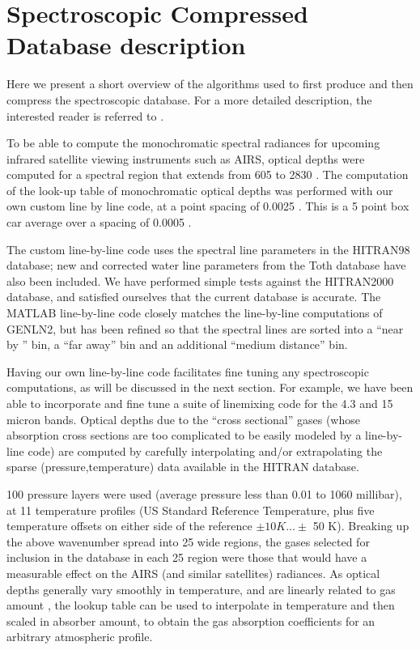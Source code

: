 \documentclass[11pt]{article}
\begin{document}
\section{Spectroscopic Compressed Database description}

Here we present a short overview of the algorithms used to first produce and 
then compress the spectroscopic database. For a more detailed description,
the interested reader is referred to \cite{str:97}.

To be able to compute the monochromatic spectral radiances for upcoming 
infrared satellite viewing instruments such as AIRS, optical depths were 
computed for a spectral region that extends from 605 \wn to 2830 \wn. The 
computation of the look-up table of monochromatic optical depths was 
performed with our own custom line by line code, at a point spacing of 
0.0025 \wn. This is a 5 point box car average over a spacing of 0.0005 \wn.

The custom line-by-line code uses the spectral line parameters in the 
\textsf{HITRAN98} database; new and corrected water line parameters from 
the \textsf{Toth} database have also been included. We have performed simple
tests against the \textsf{HITRAN2000} database, and satisfied ourselves that 
the current database is accurate. The \textsf{MATLAB} 
line-by-line code closely matches the line-by-line computations of 
\textsf{GENLN2}\cite{edw:92}, but has been refined so that the spectral lines
are sorted into a ``near by '' bin, a ``far away'' bin and an additional 
``medium distance'' bin. 

Having our own line-by-line code facilitates fine 
tuning any spectroscopic computations, as will be discussed in the next 
section. For example, we have been able to incorporate and fine tune a suite 
of linemixing code for the 4.3 and 15 micron \cd bands.
Optical depths due to the ``cross sectional'' gases (whose absorption cross 
sections are too complicated to be easily modeled by a line-by-line code) are 
computed by carefully interpolating and/or extrapolating the sparse 
(pressure,temperature) data available in the \textsf{HITRAN} database.

100 pressure layers were used (average pressure less than 0.01 
to 1060 millibar), at 11 temperature profiles (US Standard Reference
Temperature, plus five temperature offsets on either side of the
reference $\pm 10 K ... \pm$ 50 K). Breaking up the above wavenumber
spread into 25 \wn wide regions, the gases selected for inclusion in
the database in each 25 \wn region were those that would have a
measurable effect on the AIRS (and similar satellites) radiances.  As
optical depths generally vary smoothly in temperature, and are
linearly related to gas amount \cite{str:97}, the lookup table can be
used to interpolate in temperature and then scaled in absorber amount, to
obtain the gas absorption coefficients for an arbitrary atmospheric profile.
\end{document}
